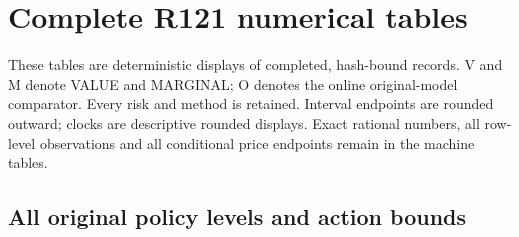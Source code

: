 \section{Complete R121 numerical tables}\label{sec:developmentresults121}

These tables are deterministic displays of completed, hash-bound records. V and M denote VALUE and MARGINAL; O denotes the online original-model comparator. Every risk and method is retained. Interval endpoints are rounded outward; clocks are descriptive rounded displays. Exact rational numbers, all row-level observations and all conditional price endpoints remain in the machine tables.

\subsection{All original policy levels and action bounds}

